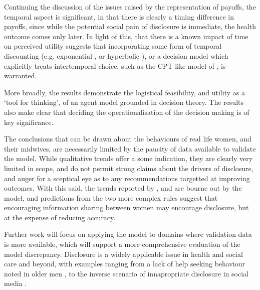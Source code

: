 Continuing the discussion of the issues raised by the representation of payoffs, the temporal aspect is significant, in that there is clearly a timing difference in payoffs, since while the potential social pain of disclosure is immediate, the health outcome comes only later. In light of this, that there is a known impact of time on perceived utility \citet{Thaler1981} suggests that incorporating some form of temporal discounting (e.g. exponential \citep{Samuelson1937}, or hyperbolic \citep{Ainslie1991}), or a decision model which explicitly treats intertemporal choice, such as the \ac{CPT} like model of \citet{Loewenstein1992}, is warranted. 

More broadly, the results demonstrate the logistical feasibility, and utility as a `tool for thinking', of an agent model grounded in decision theory. The results also make clear that deciding the operationalisation of the decision making is of key significance.

The conclusions that can be drawn about the behaviours of real life women, and their midwives, are necessarily limited by the paucity of data available to validate the model. While qualitative trends offer a some indication, they are clearly very limited in scope, and do not permit strong claims about the drivers of disclosure, and auger for a sceptical eye as to any recommendations targetted at improving outcomes.  With this said, the trends reported by \citet{Alvik2006}, and \citet{Phillips2007} are bourne out by the model, and predictions from the two more complex rules suggest that encouraging information sharing between women may encourage disclosure, but at the expense of reducing accuracy.

Further work will focus on applying the model to domains where validation data is more available, which will support a more comprehensive evaluation of the model discrepancy.  Disclosure is a widely applicable issue in health and social care and beyond, with examples ranging from a lack of help seeking behaviour noted in older men \citep{Smith2007a}, to the inverse scenario of innapropriate disclosure in social media \citep{christofides2009information}.